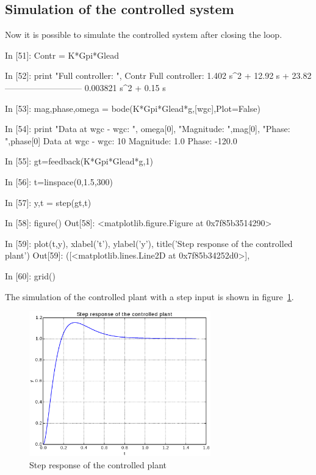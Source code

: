 \subsection{Simulation of the controlled system}

Now it is possible to simulate the controlled system after closing the loop.

\begin{code}
In [51]: Contr = K*Gpi*Glead

In [52]: print "Full controller: ", Contr
Full controller:  
1.402 s^2 + 12.92 s + 23.82
---------------------------
   0.003821 s^2 + 0.15 s

In [53]: mag,phase,omega = bode(K*Gpi*Glead*g,[wgc],Plot=False)

In [54]: print "Data at wgc - wgc: ", omega[0], "Magnitude: ",mag[0], "Phase: 
",phase[0]
Data at wgc - wgc:  10 Magnitude:  1.0 Phase:  -120.0

In [55]: gt=feedback(K*Gpi*Glead*g,1)

In [56]: t=linspace(0,1.5,300)

In [57]: y,t = step(gt,t)

In [58]: figure()
Out[58]: <matplotlib.figure.Figure at 0x7f85b3514290>

In [59]: plot(t,y), xlabel('t'), ylabel('y'), title('Step response of the 
controlled plant')
Out[59]: 
([<matplotlib.lines.Line2D at 0x7f85b34252d0>],

In [60]: grid()
\end{code}

The simulation of the controlled plant with a step input is shown in 
figure~\ref{F14}.

\begin{figure}[htbp]	%
\centering
\includegraphics[width=0.7\textwidth]{eps/pidexastep.eps}
\caption{Step response of the controlled plant}
\label{F14}
\end{figure}

